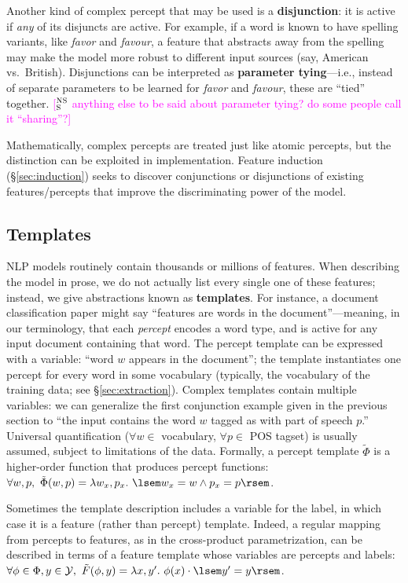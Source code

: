 \documentclass[11pt,letterpaper]{article}
\newcommand{\ensuretext}[1]{#1}
\newcommand{\nssmarker}{\ensuretext{\textcolor{magenta}{\ensuremath{^{\textsc{NS}}_{\textsc{S}}}}}}
\newcommand{\arkcomment}[3]{\ensuretext{\textcolor{#3}{[#1 #2]}}}
\newcommand{\nss}[1]{\arkcomment{\nssmarker}{#1}{magenta}}
\newcommand{\Sref}[1]{\S\ref{#1}}
\begin{document}
Another kind of complex percept that may be used is a \textbf{disjunction}: it is active if 
{\em any} of its disjuncts are active. For example, if a word is known to have spelling variants, 
like \textit{favor} and \textit{favour}, a feature that abstracts away from the spelling 
may make the model more robust to different input sources (say, American vs.~British).
Disjunctions can be interpreted as \textbf{parameter tying}---i.e., instead of separate parameters 
to be learned for \textit{favor} and \textit{favour}, these are ``tied'' together.
\nss{anything else to be said about parameter tying? do some people call it ``sharing''?}

Mathematically, complex percepts are treated just like atomic percepts, 
but the distinction can be exploited in implementation.
Feature induction (\Sref{sec:induction}) seeks to discover conjunctions or disjunctions of 
existing features/percepts that improve the discriminating power of the model.


\subsection{Templates}

NLP models routinely contain thousands or millions of features. 
When describing the model in prose, we do not actually list every single one of these features; 
instead, we give abstractions known as \textbf{templates}. 
For instance, a document classification paper might say ``features are words in the document''---meaning, 
in our terminology, that each {\em percept} encodes a word type, and is active for any input document containing that word.
The percept template can be expressed with a variable: ``word $w$ appears in the document''; 
the template instantiates one percept for every word in some vocabulary 
(typically, the vocabulary of the training data; see \Sref{sec:extraction}). 
Complex templates contain multiple variables: we can generalize the first conjunction example given in the previous section to 
``the input contains the word $w$ tagged as with part of speech $p$.'' 
Universal quantification ($\forall w \in$ vocabulary, $\forall p \in$ POS tagset) 
is usually assumed, subject to limitations of the data.
Formally, a percept template $\tilde{\Phi}$ is a higher-order function 
that produces percept functions: $\forall w,p,\ \tilde{\Phi}(w, p) = \lambda w_x,p_x.\ \lsem w_x=w \wedge p_x=p \rsem$.

Sometimes the template description includes a variable for the label, 
in which case it is a feature (rather than percept) template.
Indeed, a regular mapping from percepts to features, 
as in the cross-product parametrization, can be described in terms of a feature template 
whose variables are percepts and labels: 
$\forall \phi\in\Phi, y\in\mathcal{Y},\ \tilde{F}(\phi,y) = \lambda x,y'.\ \phi(x) \cdot \lsem y'=y \rsem$.
\end{document}
